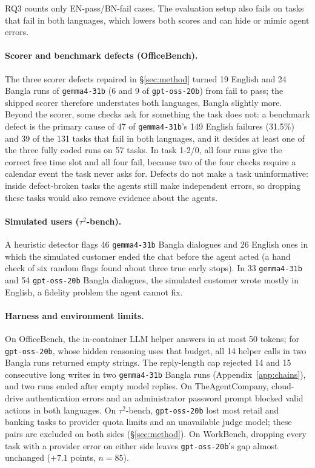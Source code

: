 \documentclass[11pt]{article}
\newcommand{\gemma}{\texttt{gemma4-31b}}
\newcommand{\gptoss}{\texttt{gpt-oss-20b}}
\newcommand{\OB}{OfficeBench}
\newcommand{\WB}{WorkBench}
\newcommand{\TAU}{$\tau^2$-bench}
\newcommand{\TAC}{TheAgentCompany}
\begin{document}
RQ3 counts only EN-pass/BN-fail cases. The evaluation setup also fails on tasks that fail in
both languages, which lowers both scores and can hide or mimic agent errors.

\paragraph{Scorer and benchmark defects (\OB{}).} The three scorer defects repaired in
\S\ref{sec:method} turned 19 English and 24 Bangla runs of \gemma{} (6 and 9 of \gptoss{}) from fail
to pass; the shipped scorer therefore understates both languages, Bangla slightly more. Beyond the
scorer, some checks ask for something the task does not: a benchmark defect is the primary cause of
47 of \gemma{}'s 149 English failures (31.5\%) and 39 of the 131 tasks that fail in both languages,
and it decides at least one of the three fully coded runs on 57 tasks. In task 1-2/0, all four runs
give the correct free time slot and all four fail, because two of the four checks require a
calendar event the task never asks for. Defects do not make a task uninformative: inside
defect-broken tasks the agents still make independent errors, so dropping these tasks would also
remove evidence about the agents.

\paragraph{Simulated users (\TAU{}).} A heuristic detector flags 46 \gemma{} Bangla dialogues and
26 English ones in which the simulated customer ended the chat before the agent acted (a hand check
of six random flags found about three true early stops). In 33 \gemma{} and 54 \gptoss{} Bangla
dialogues, the simulated customer wrote mostly in English, a fidelity problem the agent cannot fix.

\paragraph{Harness and environment limits.} On \OB{}, the in-container LLM helper answers in at most
50 tokens; for \gptoss{}, whose hidden reasoning uses that budget, all 14 helper calls in two Bangla
runs returned empty strings. The reply-length cap rejected 14 and 15 consecutive long writes in two
\gemma{} Bangla runs (Appendix~\ref{app:chains}), and two runs ended after empty model replies. On
\TAC{}, cloud-drive authentication errors and an administrator password prompt blocked valid actions
in both languages. On \TAU{}, \gptoss{} lost most retail and banking tasks to provider quota limits
and an unavailable judge model; these pairs are excluded on both sides (\S\ref{sec:method}). On
\WB{}, dropping every task with a provider error on either side leaves \gptoss{}'s gap almost
unchanged ($+7.1$ points, $n=85$).
\end{document}
